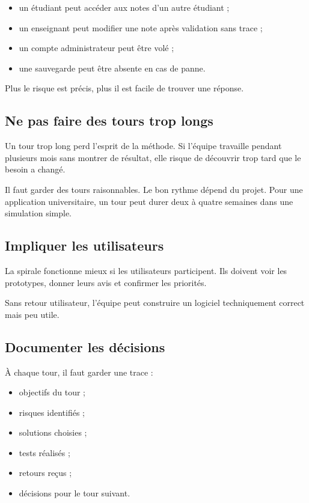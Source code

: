\documentclass[12pt,a4paper]{article}
\begin{document}
\begin{itemize}
    \item un étudiant peut accéder aux notes d'un autre étudiant ;
    \item un enseignant peut modifier une note après validation sans trace ;
    \item un compte administrateur peut être volé ;
    \item une sauvegarde peut être absente en cas de panne.
\end{itemize}

Plus le risque est précis, plus il est facile de trouver une réponse.

\subsection{Ne pas faire des tours trop longs}

Un tour trop long perd l'esprit de la méthode. Si l'équipe travaille pendant plusieurs mois sans montrer de résultat, elle risque de découvrir trop tard que le besoin a changé.

Il faut garder des tours raisonnables. Le bon rythme dépend du projet. Pour une application universitaire, un tour peut durer deux à quatre semaines dans une simulation simple.

\subsection{Impliquer les utilisateurs}

La spirale fonctionne mieux si les utilisateurs participent. Ils doivent voir les prototypes, donner leurs avis et confirmer les priorités.

Sans retour utilisateur, l'équipe peut construire un logiciel techniquement correct mais peu utile.

\subsection{Documenter les décisions}

À chaque tour, il faut garder une trace :

\begin{itemize}
    \item objectifs du tour ;
    \item risques identifiés ;
    \item solutions choisies ;
    \item tests réalisés ;
    \item retours reçus ;
    \item décisions pour le tour suivant.
\end{itemize}
\end{document}
